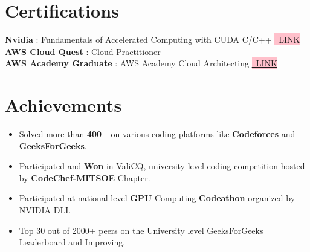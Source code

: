 \documentclass[letterpaper,11pt]{article}
\makeatletter
\newcommand{\resumeItem}[1]{
  \item\small{
    {#1 \vspace{-2pt}}
  }
}
\newcommand{\resumeSubheading}[4]{
  \vspace{-2pt}\item
    \begin{tabular*}{1.0\textwidth}[t]{l@{\extracolsep{\fill}}r}
      \textbf{#1} & \textbf{\small #2} \\
      \textit{\small#3} & \textit{\small #4} \\
    \end{tabular*}\vspace{-7pt}
}
\newcommand{\resumeSubHeadingListStart}{\begin{itemize}[leftmargin=0.0in, label={}]}
\newcommand{\resumeSubHeadingListEnd}{\end{itemize}}
\newcommand{\resumeItemListStart}{\begin{itemize}}
\newcommand{\resumeItemListEnd}{\end{itemize}\vspace{-5pt}}
\makeatother
\begin{document}
%
\section{Certifications}
 \begin{itemize}[leftmargin=0.15in, label={}]
    \small{\item{
     \textbf{Nvidia} : Fundamentals of Accelerated Computing with CUDA C/C++\hspace{0.2cm} \colorbox{pink}{\href{https://courses.nvidia.com/certificates/f4562fbcfdb54cc086b362b4a8e33f64/}{\tiny\ LINK}} \\
     \textbf{AWS Cloud Quest} : Cloud Practitioner \\
     \textbf{AWS Academy Graduate} : AWS Academy Cloud Architecting\hspace{0.2cm} \colorbox{pink}{\href{https://www.credly.com/go/lq267fnl}{\tiny\ LINK}}
    }}
 \end{itemize}
 \vspace{-16pt}


\section{Achievements}
    \resumeSubHeadingListStart
        \resumeItemListStart
            \resumeItem{Solved more than \textbf{400}+ on various coding platforms like \textbf{Codeforces} and \textbf{GeeksForGeeks}.}
            \resumeItem{Participated and \textbf{Won} in ValiCQ, university level coding competition hosted by \textbf{CodeChef-MITSOE} Chapter.}
            \resumeItem{Participated at national level \textbf{GPU} Computing \textbf{Codeathon} organized by NVIDIA DLI.}
            \resumeItem{Top 30 out of 2000+ peers on the University level GeeksForGeeks Leaderboard and Improving.}
        \resumeItemListEnd
     \resumeSubHeadingListEnd
        
    
        
\end{document}
